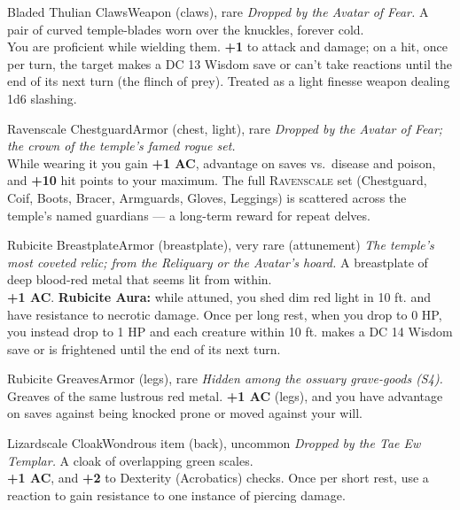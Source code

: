 \documentclass[10pt,twoside]{article}
\newcommand{\eqname}[1]{\textsc{#1}}
\begin{document}
\begin{itemcard}{Bladed Thulian Claws}{Weapon (claws), rare}
\emph{Dropped by the Avatar of Fear.} A pair of curved temple-blades worn over the
knuckles, forever cold. \\
You are proficient while wielding them. \textbf{+1} to attack and damage; on a hit,
once per turn, the target makes a DC 13 Wisdom save or can't take reactions until the
end of its next turn (the flinch of prey). Treated as a light finesse weapon dealing
1d6 slashing.
\end{itemcard}

\begin{itemcard}{Ravenscale Chestguard}{Armor (chest, light), rare}
\emph{Dropped by the Avatar of Fear; the crown of the temple's famed rogue set.} \\
While wearing it you gain \textbf{+1 AC}, advantage on saves vs.\ disease and poison,
and \textbf{+10} hit points to your maximum. The full \eqname{Ravenscale} set
(Chestguard, Coif, Boots, Bracer, Armguards, Gloves, Leggings) is scattered across the
temple's named guardians --- a long-term reward for repeat delves.
\end{itemcard}

\begin{itemcard}{Rubicite Breastplate}{Armor (breastplate), very rare (attunement)}
\emph{The temple's most coveted relic; from the Reliquary or the Avatar's hoard.} A
breastplate of deep blood-red metal that seems lit from within. \\
\textbf{+1 AC}. \textbf{Rubicite Aura:} while attuned, you shed dim red light in 10 ft.
and have resistance to necrotic damage. Once per long rest, when you drop to 0 HP, you
instead drop to 1 HP and each creature within 10 ft. makes a DC 14 Wisdom save or is
frightened until the end of its next turn.
\end{itemcard}

\begin{itemcard}{Rubicite Greaves}{Armor (legs), rare}
\emph{Hidden among the ossuary grave-goods (S4).} Greaves of the same lustrous red
metal. \textbf{+1 AC} (legs), and you have advantage on saves against being knocked
prone or moved against your will.
\end{itemcard}

\begin{itemcard}{Lizardscale Cloak}{Wondrous item (back), uncommon}
\emph{Dropped by the Tae Ew Templar.} A cloak of overlapping green scales. \\
\textbf{+1 AC}, and \textbf{+2} to Dexterity (Acrobatics) checks. Once per short rest,
use a reaction to gain resistance to one instance of piercing damage.
\end{itemcard}
\end{document}
